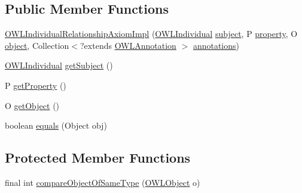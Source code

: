 \subsection*{Public Member Functions}
\begin{DoxyCompactItemize}
\item 
\hyperlink{classuk_1_1ac_1_1manchester_1_1cs_1_1owl_1_1owlapi_1_1_o_w_l_individual_relationship_axiom_impl_2e65835829d24af56b0ce2178ea3b61b_afa7cb43c4b6aac1970d3adb8efe96063}{O\-W\-L\-Individual\-Relationship\-Axiom\-Impl} (\hyperlink{interfaceorg_1_1semanticweb_1_1owlapi_1_1model_1_1_o_w_l_individual}{O\-W\-L\-Individual} \hyperlink{classuk_1_1ac_1_1manchester_1_1cs_1_1owl_1_1owlapi_1_1_o_w_l_individual_relationship_axiom_impl_2e65835829d24af56b0ce2178ea3b61b_a7b6b0d5f8fd1c18140958d21d7acb633}{subject}, P \hyperlink{classuk_1_1ac_1_1manchester_1_1cs_1_1owl_1_1owlapi_1_1_o_w_l_individual_relationship_axiom_impl_2e65835829d24af56b0ce2178ea3b61b_a591aa119d05452dd487de9ddcb44f010}{property}, O \hyperlink{classuk_1_1ac_1_1manchester_1_1cs_1_1owl_1_1owlapi_1_1_o_w_l_individual_relationship_axiom_impl_2e65835829d24af56b0ce2178ea3b61b_aa3a374ed0574781ffd25ac99e8ffc40a}{object}, Collection$<$?extends \hyperlink{interfaceorg_1_1semanticweb_1_1owlapi_1_1model_1_1_o_w_l_annotation}{O\-W\-L\-Annotation} $>$ \hyperlink{classuk_1_1ac_1_1manchester_1_1cs_1_1owl_1_1owlapi_1_1_o_w_l_axiom_impl_af6fbf6188f7bdcdc6bef5766feed695e}{annotations})
\item 
\hyperlink{interfaceorg_1_1semanticweb_1_1owlapi_1_1model_1_1_o_w_l_individual}{O\-W\-L\-Individual} \hyperlink{classuk_1_1ac_1_1manchester_1_1cs_1_1owl_1_1owlapi_1_1_o_w_l_individual_relationship_axiom_impl_2e65835829d24af56b0ce2178ea3b61b_af547fab9d0029958b209f44daa1584fc}{get\-Subject} ()
\item 
P \hyperlink{classuk_1_1ac_1_1manchester_1_1cs_1_1owl_1_1owlapi_1_1_o_w_l_individual_relationship_axiom_impl_2e65835829d24af56b0ce2178ea3b61b_af57d9211f1b5287ecbe6741d81ceb505}{get\-Property} ()
\item 
O \hyperlink{classuk_1_1ac_1_1manchester_1_1cs_1_1owl_1_1owlapi_1_1_o_w_l_individual_relationship_axiom_impl_2e65835829d24af56b0ce2178ea3b61b_afb1a6ee1fd7bd4f9b367bc8cacb89d62}{get\-Object} ()
\item 
boolean \hyperlink{classuk_1_1ac_1_1manchester_1_1cs_1_1owl_1_1owlapi_1_1_o_w_l_individual_relationship_axiom_impl_2e65835829d24af56b0ce2178ea3b61b_a9600155b2be40e7001430db3bffaf3b3}{equals} (Object obj)
\end{DoxyCompactItemize}
\subsection*{Protected Member Functions}
\begin{DoxyCompactItemize}
\item 
final int \hyperlink{classuk_1_1ac_1_1manchester_1_1cs_1_1owl_1_1owlapi_1_1_o_w_l_individual_relationship_axiom_impl_2e65835829d24af56b0ce2178ea3b61b_ab9a200426afff729c2415d2228e06e5d}{compare\-Object\-Of\-Same\-Type} (\hyperlink{interfaceorg_1_1semanticweb_1_1owlapi_1_1model_1_1_o_w_l_object}{O\-W\-L\-Object} o)
\end{DoxyCompactItemize}
